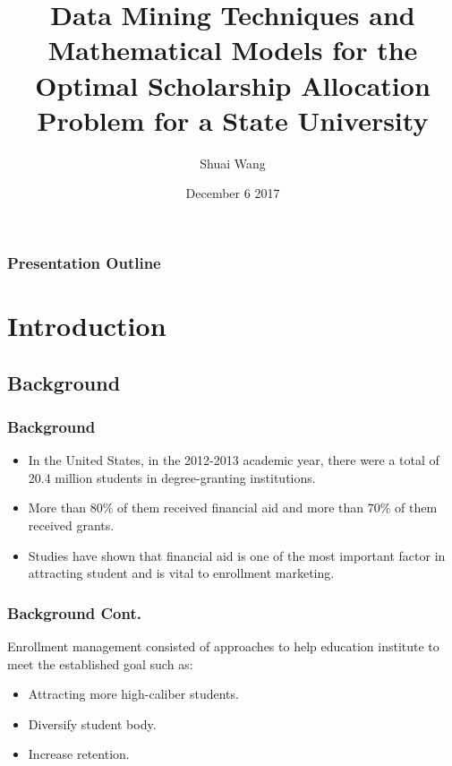 \documentclass{beamer}
\title{Data Mining Techniques and Mathematical Models for
the Optimal Scholarship Allocation Problem for a State University}
\author{Shuai Wang} %
\institute{Wright State University \\

	Department of Biomedical, Industrial \& Human Factors Engineering}
\date{December 6 2017}
\begin{document}
\begin{frame}
        \titlepage
       
\end{frame}


\begin{frame}
    \frametitle{Presentation Outline}
    
 \tableofcontents
 
\end{frame}


\section{Introduction}  

\subsection{Background}
\begin{frame}
    \frametitle{Background}
\begin{itemize}
\item In the United States, in the 2012-2013 academic year, there were a total 
of 20.4 million students in degree-granting institutions.
\item More than 80\% of them received financial aid and more than 70\% of
them received grants.
\item  Studies have shown that financial aid is one of the most important
factor in attracting student and is vital to enrollment marketing.
\end{itemize}
\end{frame}

\begin{frame}
	\frametitle{Background Cont.}
    Enrollment management consisted of approaches to help education institute
to meet the established goal such as:
   \begin{itemize}
   \item Attracting more high-caliber students.
   \item Diversify student body.
   \item Increase retention.
   \end{itemize} 
\end{frame}
\end{document}
